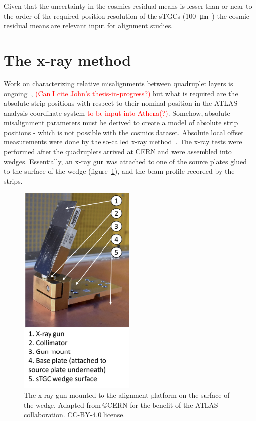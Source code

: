 Given that the uncertainty in the cosmics residual means is lesser than or near to the order of the required position resolution of the sTGCs (\SI{100}{\micro\meter}~\cite{nsw_tdr}) the cosmic residual means are relevant input for alignment studies.

\section{The x-ray method}
\label{x_ray}

Work on characterizing relative misalignments between quadruplet layers is ongoing~\cite{zhao_cosmic_2019}, \textcolor{red}{(Can I cite John's thesis-in-progress?)} but what is required are the absolute strip positions with respect to their nominal position in the ATLAS analysis coordinate system \textcolor{red}{to be input into Athena(?)}. Somehow, absolute misalignment parameters must be derived to create a model of absolute strip positions - which is not possible with the cosmics dataset. Absolute local offset measurements were done by the so-called x-ray method~\cite{lefebvre_precision_2020}. The x-ray tests were performed after the quadruplets arrived at CERN and were assembled into wedges. Essentially, an x-ray gun was attached to one of the source plates glued to the surface of the wedge (figure~\ref{fig:xray_setup}), and the beam profile recorded by the strips.

\begin{figure}
    \centering
    \includegraphics[width = 0.5\textwidth]{figures/figure_xray_setup.pdf}
    \caption{The x-ray gun mounted to the alignment platform on the surface of the wedge. Adapted from \copyright  CERN for the benefit of the ATLAS collaboration. CC-BY-4.0 license.}
    \label{fig:xray_setup}
\end{figure}


